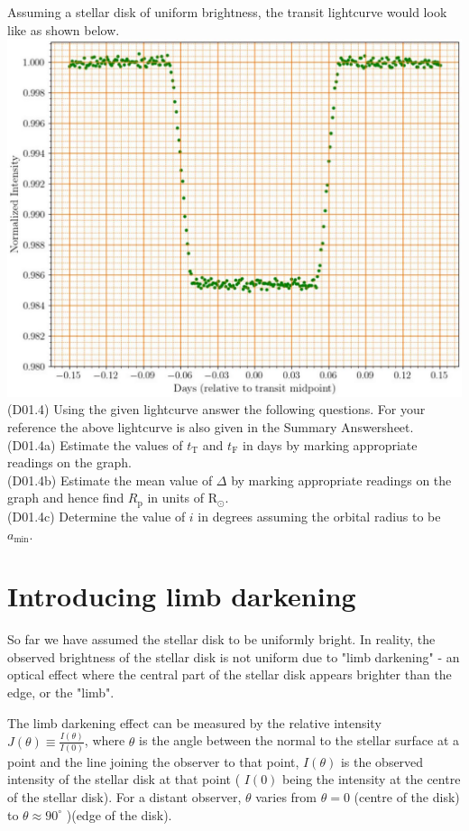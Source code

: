 \documentclass[10pt]{article}
\begin{document}
    Assuming a stellar disk of uniform brightness, the transit lightcurve would look like as shown below.\\
    \includegraphics[max width=\textwidth, center]{2025_08_23_9a7c688c47c330d7bfc8g-3}\\
    (D01.4) Using the given lightcurve answer the following questions. For your reference the above lightcurve is also given in the Summary Answersheet.\\
    (D01.4a) Estimate the values of $t_{\mathrm{T}}$ and $t_{\mathrm{F}}$ in days by marking appropriate readings on the graph.\\
    (D01.4b) Estimate the mean value of $\Delta$ by marking appropriate readings on the graph and hence find $R_{\mathrm{p}}$ in units of $\mathrm{R}_{\odot}$.\\
    (D01.4c) Determine the value of $i$ in degrees assuming the orbital radius to be $a_{\min }$.
    
    \section*{Introducing limb darkening}
    So far we have assumed the stellar disk to be uniformly bright. In reality, the observed brightness of the stellar disk is not uniform due to "limb darkening" - an optical effect where the central part of the stellar disk appears brighter than the edge, or the "limb".
    
    The limb darkening effect can be measured by the relative intensity $J(\theta) \equiv \frac{I(\theta)}{I(0)}$, where $\theta$ is the angle between the normal to the stellar surface at a point and the line joining the observer to that point, $I(\theta)$ is the observed intensity of the stellar disk at that point ( $I(0)$ being the intensity at the centre of the stellar disk). For a distant observer, $\theta$ varies from $\theta=0$ (centre of the disk) to $\theta \approx 90^{\circ}$ )(edge of the disk).
    
\end{document}
